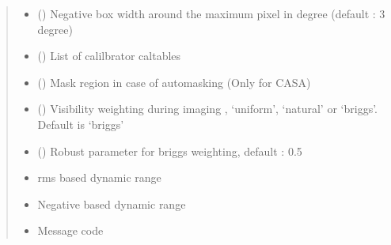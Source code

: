 \documentclass[letterpaper,10pt,english]{sphinxmanual}
\begin{document}
\begin{fulllineitems}
\begin{fulllineitems}
\begin{quote}
\begin{description}
\begin{itemize}
\item {} 
\sphinxAtStartPar
{} () \textendash{} Negative box width around the maximum pixel in degree (default : 3 degree)

\item {} 
\sphinxAtStartPar
{} () \textendash{} List of calilbrator caltables

\item {} 
\sphinxAtStartPar
{} () \textendash{} Mask region in case of auto\sphinxhyphen{}masking (Only for CASA)

\item {} 
\sphinxAtStartPar
{} () \textendash{} Visibility weighting during imaging , ‘uniform’, ‘natural’ or ‘briggs’. Default is ‘briggs’

\item {} 
\sphinxAtStartPar
{} () \textendash{} Robust parameter for briggs weighting, default : 0.5

\end{itemize}

\item[{Returns}] \leavevmode
\sphinxAtStartPar
\begin{itemize}
\item {} 
\sphinxAtStartPar
{} \textendash{} rms based dynamic range

\item {} 
\sphinxAtStartPar
{} \textendash{} Negative based dynamic range

\item {} 
\sphinxAtStartPar
{} \textendash{} Message code

\end{itemize}


\end{description}\end{quote}

\end{fulllineitems}



\end{fulllineitems}
\end{document}
